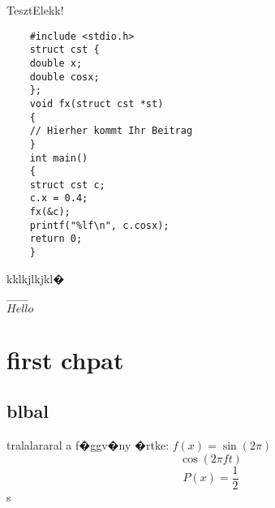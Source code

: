 \documentclass{article}
\begin{document}
TesztElekk!

\begin{lstlisting}
    #include <stdio.h>
    struct cst {
    double x;
    double cosx;
    };
    void fx(struct cst *st)
    {
    // Hierher kommt Ihr Beitrag
    }
    int main()
    {
    struct cst c;
    c.x = 0.4;
    fx(&c);
    printf("%lf\n", c.cosx);
    return 0;
    }
    \end{lstlisting}


kklkjlkjkl�

$\overrightarrow{Hello}$


\section{first chpat}
\subsection{blbal}
tralalararal a                                    f�ggv�ny �rtke: $f(x)=\sin (2 \pi)$
$$\cos(2\pi ft ) $$
\begin{equation}
P(x)= \frac{1}{2}
\end{equation}
s
\end{document}
